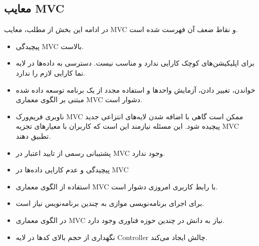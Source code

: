 \subsection{معایب MVC}
در ادامه این بخش از مطلب، معایب MVC و نقاط ضعف آن فهرست شده است.
\begin{itemize}
	\item
	پیچیدگی MVC بالاست.
	\item
	برای اپلیکیشن‌های کوچک کارایی ندارد و مناسب نیست.
	دسترسی به داده‌ها در لایه نما کارایی لازم را ندارد.
	\item
	خواندن، تغییر دادن، آزمایش واحدها و استفاده مجدد از یک برنامه توسعه داده شده مبتنی بر الگوی معماری MVC دشوار است.
	\item
	ناوبری فریم‌ورک MVC ممکن است گاهی با اضافه شدن لایه‌های انتزاعی جدید پیچیده شود. این مسئله نیازمند این است که کاربران با معیارهای تجزیه MVC تطبیق دهند.
	\item
	پشتیبانی رسمی از تایید اعتبار در MVC وجود ندارد.
	\item
	پیچیدگی و عدم کارایی داده‌ها در MVC
	\item
	استفاده از الگوی معماری MVC با رابط کاربری امروزی دشوار است.
	\item
	برای اجرای برنامه‌نویسی موازی به چندین برنامه‌نویس نیاز است.
	\item
	در الگوی معماری MVC نیاز به دانش در چندین حوزه فناوری وجود دارد.
	\item
	نگهداری از حجم بالای کدها در لایه Controller چالش ایجاد می‌کند.
\end{itemize}


